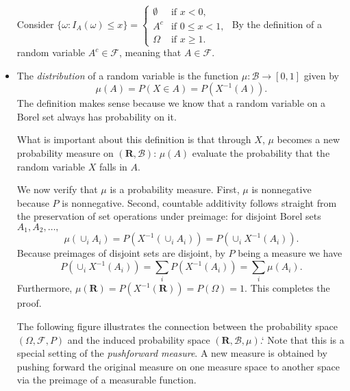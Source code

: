 \documentclass[11pt]{article}
\newcommand{\df}[1]{\textit{\textsf{#1}}} %
\newcommand{\R}{\mathbf{R}}
\newcommand{\B}{\mathcal{B}} %
\newcommand{\F}{\mathcal{F}} %
\begin{document}
\begin{itemize}
    Consider $\{\omega : I_A(\omega) \leq x\} = 
    \begin{cases}
        \emptyset & \text{if } x < 0, \\
        A^c & \text{if } 0 \leq x < 1, \\
        \Omega & \text{if } x \geq 1.
    \end{cases}$ By the definition of a random variable $A^c \in \F$, meaning that $A \in \F$.
    \item The \df{distribution} of a random variable is the function $\mu: \B \to [0,1]$ given by \[\mu(A) = P(X \in A) = P(X^{-1}(A)).\]
    The definition makes sense because we know that a random variable on a Borel set always has probability on it.

    What is important about this definition is that through $X$, $\mu$ becomes a new probability measure on $(\R, \B)$: $\mu(A)$ evaluate the probability that the random variable $X$ falls in $A$.

    We now verify that $\mu$ is a probability measure. First, $\mu$ is nonnegative because $P$ is nonnegative. Second, countable additivity follows straight from the preservation of set operations under preimage: for disjoint Borel sets $A_1,A_2,\dots,$ \[\mu(\cup_i A_i) = P(X^{-1}(\cup_i A_i)) = P(\cup_i X^{-1}(A_i)).\] Because preimages of disjoint sets are disjoint, by $P$ being a measure we have \[\textstyle P(\cup_i X^{-1}(A_i)) = \sum_i P(X^{-1}(A_i)) = \sum_i \mu(A_i).\] Furthermore, $\mu(\R) = P(X^{-1}(\R)) = P(\Omega) = 1$. This completes the proof.
    
    The following figure illustrates the connection between the probability space $(\Omega,\F,P)$ and the induced probability space $(\R,\B,\mu)$.`
    Note that this is a special setting of the \df{pushforward measure}. A new measure is obtained by pushing forward the original measure on one measure space to another space via the preimage of a measurable function.
    
\end{itemize}
\end{document}
